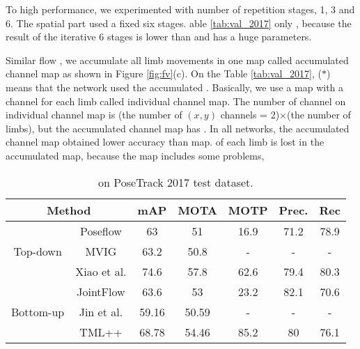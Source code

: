 \documentclass[conference]{IEEEtran}
\begin{document}
To  high performance, we experimented with  number of repetition stages, 1, 3 and 6. 
The spatial part used a fixed six stages. able \ref{tab:val_2017} only , because the  result of the iterative 6 stages is lower than  and has a huge  parameters. 

Similar  flow \cite{horn1981determining}, we accumulate all limb movements in one map called accumulated channel map as shown in Figure \ref{fig:fv}(c). On the Table \ref{tab:val_2017}, ($*$) means that the network used the accumulated . Basically, we use a map with a channel for each limb called individual channel map. The number of channel on individual channel map is (the number of $(x,y)$ channels = 2)$\times$(the number of limbs), but the accumulated channel map has .
In all  networks, the accumulated channel map obtained lower accuracy than   map.   of each limb is lost in the accumulated map, because the map includes some problems,  

\begin{table}[t!]
  \centering

    \caption{ on PoseTrack 2017 test dataset.}
  \begin{adjustbox}{width=1\linewidth}

  \centering
     \begin{tabular}{r|c|c|c|c|c|c}
    \toprule
    \multicolumn{2}{c|}{Method} & mAP   & MOTA  & MOTP  & Prec. & Rec \\
    \midrule
    \midrule
    \multicolumn{1}{c|}{\multirow{3}[6]{*}{Top-down}} & Poseflow\cite{xiu2018pose} & 63    & 51    & 16.9  & 71.2  & 78.9 \\
\cmidrule{2-7}          & MVIG  & 63.2  & 50.8  & -     & -     & - \\
\cmidrule{2-7}          & Xiao et al.\cite{xiao2018simple} & 74.6  & 57.8  & 62.6  & 79.4  & 80.3 \\
    \midrule
          & JointFlow\cite{doering2018joint} & 63.6  & 53    & 23.2  & 82.1  & 70.6 \\
\cmidrule{2-7}    \multicolumn{1}{p{5.125em}|}{Bottom-up} & Jin et al.\cite{jin2017towards} & 59.16 & 50.59 & -     & -     & - \\
\cmidrule{2-7}          & TML++  & 68.78 & 54.46 & 85.2  & 80    & 76.1 \\
    \bottomrule
    \end{tabular}\end{adjustbox}

  \label{tab:comp_other}\end{table}
\end{document}

